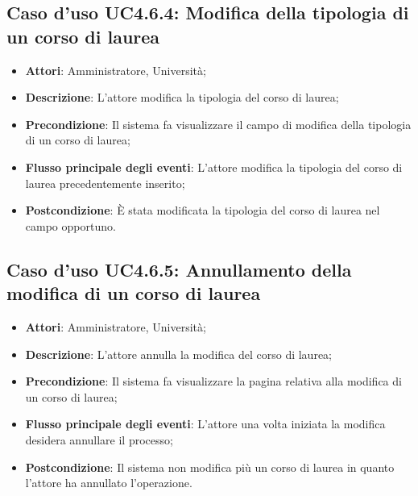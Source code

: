 \subsection{Caso d'uso \texorpdfstring{UC4.6.4}{UC4.6.4}: Modifica della tipologia di un corso di laurea}
\begin{itemize}
	\item \textbf{Attori}: Amministratore, Università;
	\item \textbf{Descrizione}: L'attore modifica la tipologia del corso di laurea;
	
	\item \textbf{Precondizione}: Il sistema fa visualizzare il campo di modifica della tipologia di un corso di laurea;
	
	
	\item \textbf{Flusso principale degli eventi}: L'attore modifica la tipologia del corso di laurea precedentemente inserito;
	
	\item \textbf{Postcondizione}: È stata modificata la tipologia del corso di laurea nel campo opportuno.
	
\end{itemize}
\subsection{Caso d'uso \texorpdfstring{UC4.6.5}{UC4.6.5}: Annullamento della modifica di un corso di laurea}
\begin{itemize}
	\item \textbf{Attori}: Amministratore, Università;
	\item \textbf{Descrizione}: L'attore annulla la modifica del corso di laurea;
	
	\item \textbf{Precondizione}: Il sistema fa visualizzare la pagina relativa alla modifica di un corso di laurea;
	
	\item \textbf{Flusso principale degli eventi}: L'attore una volta iniziata la modifica desidera annullare il processo;
	
	\item \textbf{Postcondizione}: Il sistema non modifica più un corso di laurea in quanto l'attore ha annullato l'operazione.
	
\end{itemize}
